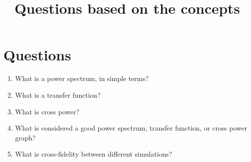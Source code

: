 \documentclass[11pt]{article}
\title{Questions based on the concepts}
\date{}
\begin{document}
\maketitle

\section{Questions}
\label{sec:questions}

\begin{enumerate}[label=\arabic*.]
  \item What is a power spectrum, in simple terms?
  \item What is a transfer function?
  \item What is cross power?
  \item What is considered a good power spectrum, transfer function, or cross
  power graph?
  \item What is cross-fidelity between different simulations?
\end{enumerate}
\end{document}
